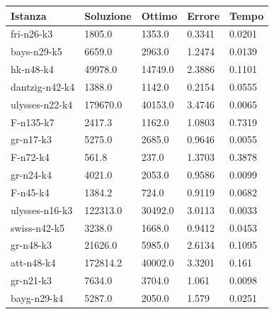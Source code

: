 \documentclass[]{article}
\begin{document}
\begin{table}[h!]
	\begin{center}	
		\begin{tabular}{||l | l l l l||} 
			\hline
			Istanza & Soluzione & Ottimo & Errore & Tempo \\ [0.5ex] 
			\hline\hline
			fri-n26-k3 & 1805.0 & 1353.0 & 0.3341 & 0.0201  \\
			bays-n29-k5 & 6659.0 & 2963.0 & 1.2474 & 0.0139  \\
			hk-n48-k4 & 49978.0 & 14749.0 & 2.3886 & 0.1101  \\
			dantzig-n42-k4 & 1388.0 & 1142.0 & 0.2154 & 0.0555  \\
			ulysses-n22-k4 & 179670.0 & 40153.0 & 3.4746 & 0.0065  \\
			F-n135-k7 & 2417.3 & 1162.0 & 1.0803 & 0.7319  \\
			gr-n17-k3 & 5275.0 & 2685.0 & 0.9646 & 0.0055  \\
			F-n72-k4 & 561.8 & 237.0 & 1.3703 & 0.3878  \\
			gr-n24-k4 & 4021.0 & 2053.0 & 0.9586 & 0.0099  \\
			F-n45-k4 & 1384.2 & 724.0 & 0.9119 & 0.0682  \\
			ulysses-n16-k3 & 122313.0 & 30492.0 & 3.0113 & 0.0033  \\
			swiss-n42-k5 & 3238.0 & 1668.0 & 0.9412 & 0.0453  \\
			gr-n48-k3 & 21626.0 & 5985.0 & 2.6134 & 0.1095  \\
			att-n48-k4 & 172814.2 & 40002.0 & 3.3201 & 0.161  \\
			gr-n21-k3 & 7634.0 & 3704.0 & 1.061 & 0.0098  \\
			bayg-n29-k4 & 5287.0 & 2050.0 & 1.579 & 0.0251  \\		
			[1ex] 
			\hline
		\end{tabular}
	\end{center}
\end{table}



\end{document}
